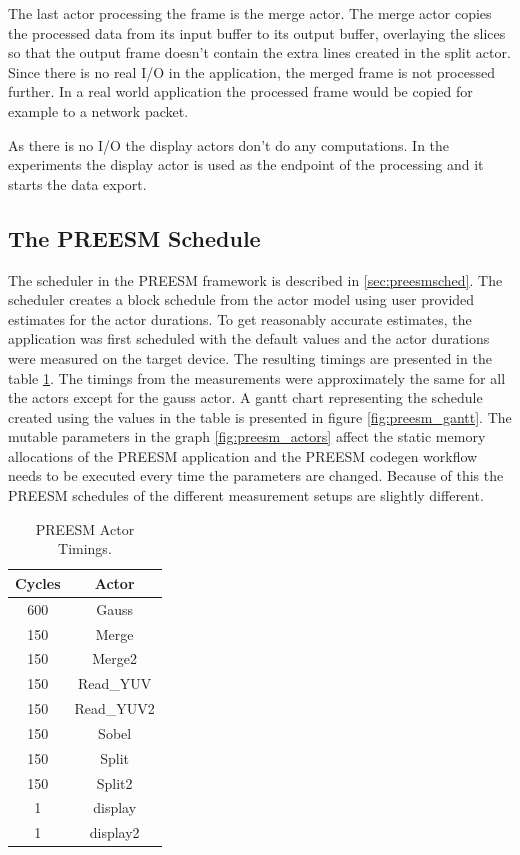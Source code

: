 The last actor processing the frame is the merge actor. The merge actor copies the processed data from its input buffer to its output buffer, overlaying the slices so that the output frame doesn't contain the extra lines created in the split actor. Since there is no real I/O in the application, the merged frame is not processed further. In a real world application the processed frame would be copied for example to a network packet.

As there is no I/O the display actors don't do any computations. In the experiments the display actor is used as the endpoint of the processing and it starts the data export. 

\subsection{The PREESM Schedule}
\label{subsec:preesmsched}
The scheduler in the PREESM framework is described in \ref{sec:preesmsched}. The scheduler creates a block schedule from the actor model using user provided estimates for the actor durations. To get reasonably accurate estimates, the application was first scheduled with the default values and the actor durations were measured on the target device. The resulting timings are presented in the table \ref{tab:preesm_times}. The timings from the measurements were approximately the same for all the actors except for the gauss actor. A gantt chart representing the schedule created using the values in the table is presented in figure \ref{fig:preesm_gantt}. The mutable parameters in the graph \ref{fig:preesm_actors} affect the static memory allocations of the PREESM application and the PREESM codegen workflow needs to be executed every time the parameters are changed. Because of this the PREESM schedules of the different measurement setups are slightly different.

\begin{table}
    \begin{center}
        \begin{tabular}{| c | c |}

            \hline
            Cycles & Actor \\ \hline
            600 & Gauss \\ \hline
            150 & Merge \\ \hline
            150 & Merge2 \\ \hline
            150 & Read\_YUV \\ \hline
            150 & Read\_YUV2 \\ \hline
            150 & Sobel \\ \hline
            150 & Split \\ \hline
            150 & Split2 \\ \hline
            1 & display \\ \hline
            1 & display2 \\ \hline
        \end{tabular}
        \caption{PREESM Actor Timings.}
        \label{tab:preesm_times}
    \end{center}
\end{table}

